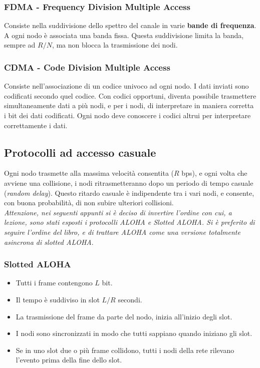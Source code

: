 \subsubsection{FDMA - Frequency Division Multiple Access}
Consiste nella suddivisione dello spettro del canale in varie \textbf{bande di frequenza}. A ogni nodo è associata una banda fissa.
Questa suddivisione limita la banda, sempre ad $R/N$, ma non blocca la trasmissione dei nodi.

\subsubsection{CDMA - Code Division Multiple Access}
Consiste nell'associazione di un codice univoco ad ogni nodo. I dati inviati sono codificati secondo quel codice. Con codici opportuni, diventa possibile trasmettere simultaneamente dati a più nodi, e per i nodi, di interpretare in maniera corretta i bit dei dati codificati. Ogni nodo deve conoscere i codici altrui per interpretare correttamente i dati.

\newpage

\subsection{Protocolli ad accesso casuale}
Ogni nodo trasmette alla massima velocità consentita ($R$ bps), e ogni volta che avviene una collisione, i nodi ritrasmetteranno dopo un periodo di tempo casuale (\textit{random delay}). Questo ritardo casuale è indipendente tra i vari nodi, e consente, con buona probabilità, di non subire ulteriori collisioni.\\
\textit{Attenzione, nei seguenti appunti si è deciso di invertire l'ordine con cui, a lezione, sono stati esposti i protocolli ALOHA e Slotted ALOHA. Si è preferito di seguire l'ordine del libro, e di trattare ALOHA come una versione totalmente asincrona di slotted ALOHA}.

\subsubsection{Slotted ALOHA}

\begin{itemize}
	\item Tutti i frame contengono $L$ bit.
	\item Il tempo è suddiviso in slot $L/R$ secondi.
	\item La trasmissione del frame da parte del nodo, inizia all'inizio degli slot.
	\item I nodi sono sincronizzati in modo che tutti sappiano quando iniziano gli slot.
	\item Se in uno slot due o più frame collidono, tutti i nodi della rete rilevano l'evento prima della fine dello slot.
\end{itemize}

